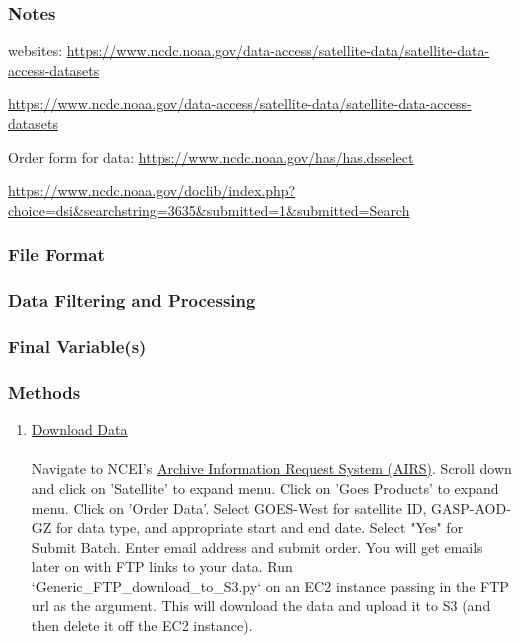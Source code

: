 \subsubsection*{Notes}

websites: \url{https://www.ncdc.noaa.gov/data-access/satellite-data/satellite-data-access-datasets}  

\url{https://www.ncdc.noaa.gov/data-access/satellite-data/satellite-data-access-datasets}

Order form for data: \url{https://www.ncdc.noaa.gov/has/has.dsselect}

\url{https://www.ncdc.noaa.gov/doclib/index.php?choice=dsi&searchstring=3635&submitted=1&submitted=Search}


\subsubsection*{File Format}

\subsubsection*{Data Filtering and Processing}

\subsubsection*{Final Variable(s)}

\subsubsection*{Methods}

\begin{enumerate}
\item \underline{Download Data}\\\\
Navigate to NCEI's \href{https://www.ncdc.noaa.gov/has/has.dsselect}{Archive Information Request System (AIRS)}. Scroll down and click on 'Satellite' to expand menu. Click on 'Goes Products' to expand menu. Click on 'Order Data'. Select GOES-West for satellite ID, GASP-AOD-GZ for data type, and appropriate start and end date. Select "Yes" for Submit Batch. Enter email address and submit order. You will get emails later on with FTP links to your data. Run `Generic\_FTP\_download\_to\_S3.py` on an EC2 instance passing in the FTP url as the argument. This will download the data and upload it to S3 (and then delete it off the EC2 instance).
\end{enumerate}


